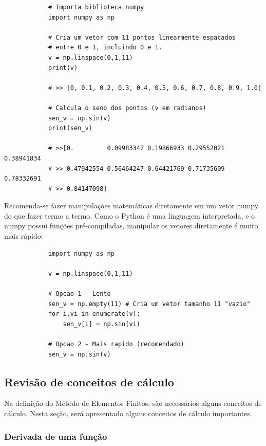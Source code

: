         \begin{lstlisting}
            # Importa biblioteca numpy
            import numpy as np

            # Cria um vetor com 11 pontos linearmente espacados
            # entre 0 e 1, incluindo 0 e 1.
            v = np.linspace(0,1,11)
            print(v)

            # >> [0, 0.1, 0.2, 0.3, 0.4, 0.5, 0.6, 0.7, 0.8, 0.9, 1.0]

            # Calcula o seno dos pontos (v em radianos)
            sen_v = np.sin(v)
            print(sen_v)

            # >>[0.         0.09983342 0.19866933 0.29552021 0.38941834 
            # >> 0.47942554 0.56464247 0.64421769 0.71735609 0.78332691 
            # >> 0.84147098]

        \end{lstlisting}

        Recomenda-se fazer manipulações matemáticas diretamente em um vetor numpy do que fazer termo a termo. Como o Python é uma linguagem interpretada, e o numpy possui funções pré-compiladas, manipular os vetores diretamente é muito mais rápido:

        \begin{lstlisting}
            import numpy as np

            v = np.linspace(0,1,11)

            # Opcao 1 - Lento
            sen_v = np.empty(11) # Cria um vetor tamanho 11 "vazio"
            for i,vi in enumerate(v):
                sen_v[i] = np.sin(vi)

            # Opcao 2 - Mais rapido (recomendado)
            sen_v = np.sin(v)

        \end{lstlisting}

    \subsection{Revisão de conceitos de cálculo}

        Na definição do Método de Elementos Finitos, são necessários alguns conceitos de cálculo. Nesta seção, será apresentado alguns conceitos de cálculo importantes.

        \subsubsection*{Derivada de uma função}


